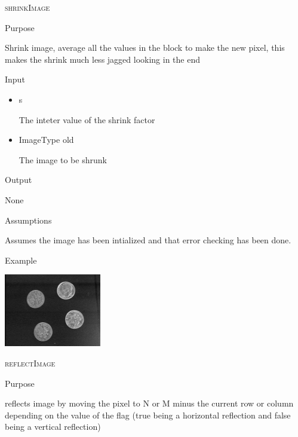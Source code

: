 \documentclass[pdftex, 11pt]{article}
\begin{document}
\begin{description}
\begin{description}
		\end{description}

	\item{\textsc{shrinkImage}}
		\begin{description}
			\item{Purpose}

				Shrink image, average all the values
				in the block to make the new pixel, this
				makes the shrink much less jagged looking in the end

			\item{Input}

				\begin{itemize}

					\item{s}

						The inteter value of the shrink factor

					\item{ImageType old}

						The image to be shrunk

				\end{itemize}

			\item{Output}

				None

			\item{Assumptions}

				Assumes the image has been intialized and that error
				checking has been done.

			\item{Example}

				\includegraphics{images/outshrink.png}

		\end{description}


	\item{\textsc{reflectImage}}
		\begin{description}
			\item{Purpose}

				reflects image by moving the pixel to N or M
				minus the current row or column
				depending on the value of the flag
				(true being a horizontal reflection and
				false being a vertical reflection)


\end{description}
\end{description}
\end{document}
